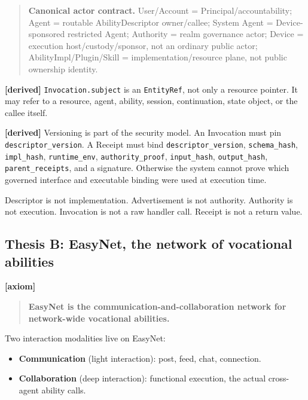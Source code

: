\documentclass[11pt,a4paper]{article}
\newcommand{\axiom}{\textcolor{axiomcolor}{\textbf{[axiom]}}\xspace}
\newcommand{\derived}{\textcolor{derivedcolor}{\textbf{[derived]}}\xspace}
\begin{document}
\begin{quote}
\textbf{Canonical actor contract.}
User/Account = Principal/accountability;
Agent = routable AbilityDescriptor owner/callee;
System Agent = Device-sponsored restricted Agent;
Authority = realm governance actor;
Device = execution host/custody/sponsor, not an ordinary public actor;
AbilityImpl/Plugin/Skill = implementation/resource plane, not public ownership identity.
\end{quote}

\derived{} \texttt{Invocation.subject} is an \texttt{EntityRef}, not only a
resource pointer. It may refer to a resource, agent, ability, session,
continuation, state object, or the callee itself.

\derived{} Versioning is part of the security model. An Invocation must pin
\texttt{descriptor\_version}. A Receipt must bind
\texttt{descriptor\_version}, \texttt{schema\_hash}, \texttt{impl\_hash},
\texttt{runtime\_env}, \texttt{authority\_proof}, \texttt{input\_hash},
\texttt{output\_hash}, \texttt{parent\_receipts}, and a signature. Otherwise
the system cannot prove which governed interface and executable binding were
used at execution time.

\begin{invariant}
Descriptor is not implementation. Advertisement is not authority. Authority is
not execution. Invocation is not a raw handler call. Receipt is not a return
value.
\end{invariant}

\subsection{Thesis B: EasyNet, the network of vocational abilities}

\axiom{}
\begin{quote}
\textbf{EasyNet is the communication-and-collaboration network for
network-wide vocational abilities.}
\end{quote}

Two interaction modalities live on EasyNet:

\begin{itemize}[leftmargin=2em,itemsep=0.3em]
    \item \textbf{Communication} (light interaction): post, feed, chat,
    connection.
    \item \textbf{Collaboration} (deep interaction): functional execution, the
    actual cross-agent ability calls.
\end{itemize}
\end{document}
